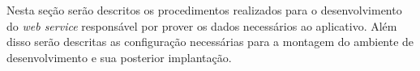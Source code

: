 
	\par Nesta seção serão descritos os procedimentos realizados para o
desenvolvimento do \textit{web service} responsável por prover os dados
necessários ao aplicativo. Além disso serão descritas as configuração
necessárias para a montagem do ambiente de desenvolvimento e sua
posterior implantação.